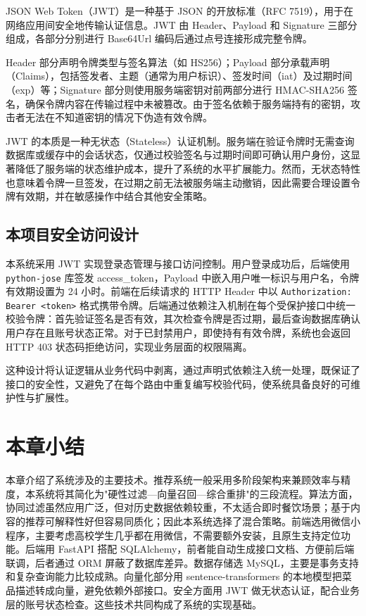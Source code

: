 JSON Web Token（JWT）是一种基于 JSON 的开放标准（RFC 7519），用于在网络应用间安全地传输认证信息。JWT 由 Header、Payload 和 Signature 三部分组成，各部分分别进行 Base64Url 编码后通过点号连接形成完整令牌。

Header 部分声明令牌类型与签名算法（如 HS256）；Payload 部分承载声明（Claims），包括签发者、主题（通常为用户标识）、签发时间（iat）及过期时间（exp）等；Signature 部分则使用服务端密钥对前两部分进行 HMAC-SHA256 签名，确保令牌内容在传输过程中未被篡改。由于签名依赖于服务端持有的密钥，攻击者无法在不知道密钥的情况下伪造有效令牌。

JWT 的本质是一种无状态（Stateless）认证机制。服务端在验证令牌时无需查询数据库或缓存中的会话状态，仅通过校验签名与过期时间即可确认用户身份，这显著降低了服务端的状态维护成本，提升了系统的水平扩展能力。然而，无状态特性也意味着令牌一旦签发，在过期之前无法被服务端主动撤销，因此需要合理设置令牌有效期，并在敏感操作中结合其他安全策略。

\subsection{本项目安全访问设计}

本系统采用 JWT 实现登录态管理与接口访问控制。用户登录成功后，后端使用 \texttt{python-jose} 库签发 access\_token，Payload 中嵌入用户唯一标识与用户名，令牌有效期设置为 24 小时。前端在后续请求的 HTTP Header 中以 \texttt{Authorization: Bearer <token>} 格式携带令牌。后端通过依赖注入机制在每个受保护接口中统一校验令牌：首先验证签名是否有效，其次检查令牌是否过期，最后查询数据库确认用户存在且账号状态正常。对于已封禁用户，即使持有有效令牌，系统也会返回 HTTP 403 状态码拒绝访问，实现业务层面的权限隔离。

这种设计将认证逻辑从业务代码中剥离，通过声明式依赖注入统一处理，既保证了接口的安全性，又避免了在每个路由中重复编写校验代码，使系统具备良好的可维护性与扩展性。

\section{本章小结}

本章介绍了系统涉及的主要技术。推荐系统一般采用多阶段架构来兼顾效率与精度，本系统将其简化为"硬性过滤—向量召回—综合重排"的三段流程。算法方面，协同过滤虽然应用广泛，但对历史数据依赖较重，不太适合即时餐饮场景；基于内容的推荐可解释性好但容易同质化；因此本系统选择了混合策略。前端选用微信小程序，主要考虑高校学生几乎都在用微信，不需要额外安装，且原生支持定位功能。后端用 FastAPI 搭配 SQLAlchemy，前者能自动生成接口文档、方便前后端联调，后者通过 ORM 屏蔽了数据库差异。数据存储选 MySQL，主要是事务支持和复杂查询能力比较成熟。向量化部分用 sentence-transformers 的本地模型把菜品描述转成向量，避免依赖外部接口。安全方面用 JWT 做无状态认证，配合业务层的账号状态检查。这些技术共同构成了系统的实现基础。
